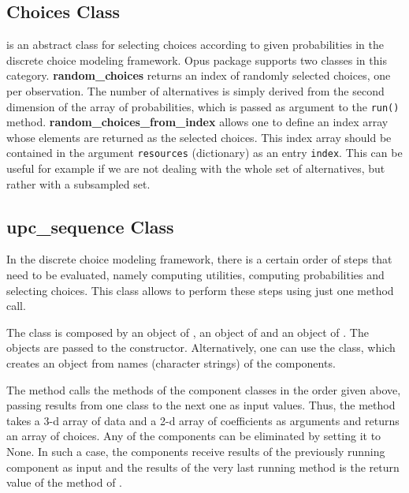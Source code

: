 \subsection{Choices Class}
\label{sec:choices}

 is an abstract class for selecting choices according to given
probabilities in the discrete choice modeling framework. Opus package  supports
two classes in this category. {\bf random_choices}  returns an index of
randomly selected choices, one per observation. The number of alternatives is
simply derived from the second dimension of the array of probabilities, which
is passed as argument to the \verb|run()| method. {\bf
  random_choices_from_index}  allows one to define an index array whose
elements are returned as the selected choices. This index array should be
contained in the argument \verb|resources| (dictionary) as an entry \verb|index|. This can be
useful for example if we are not dealing with the whole set of alternatives,
but rather with a subsampled set.

\subsection{upc_sequence Class}
\label{sec:upc-sequence}

In the discrete choice modeling framework, there is a certain order of steps
that need to be evaluated, namely computing utilities, computing
probabilities and selecting choices. This class allows to perform these steps
using just one method call.

The class  is composed by an object of ,
an object of  and an object of . The
objects are passed to the constructor. Alternatively, one can use the
 class, which creates an  object from
names (character strings) of the components.

The  method calls the  methods of the component
classes in the order given above, passing results from one class to the next
one as input values. Thus, the method takes a 3-d array of data and a 2-d
array of coefficients as arguments and returns an array of choices.  Any of
the components can be eliminated by setting it to None. In such a case, the
components receive results of the previously running component as input and
the results of the very last running method is the return value of the
 method of .

